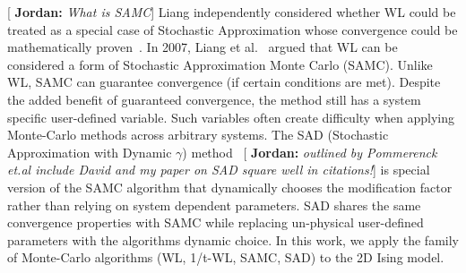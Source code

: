 \documentclass[letterpaper,twocolumn,amsmath,amssymb,pre,aps,10pt]{revtex4-1}
\newcommand{\blue}[1]{{\bf \color{blue} #1}}
\newcommand{\jpsays}[1]{{\color{red} [\blue{Jordan:} \emph{#1}]}}
\begin{document}
\jpsays{What is SAMC}
Liang independently considered whether WL could be treated as a special
case of Stochastic Approximation whose convergence could be
mathematically proven~\cite{liang2006theory, liang2007stochastic}. In
2007, Liang et al.~\cite{liang2007stochastic} argued that WL can be
considered a form of Stochastic Approximation Monte Carlo (SAMC).
Unlike WL, SAMC can guarantee convergence (if certain conditions are
met). Despite the added benefit of guaranteed convergence, the method
still has a system specific user-defined variable. Such variables often
create difficulty when applying Monte-Carlo methods across arbitrary
systems.  The SAD (Stochastic Approximation with Dynamic $\gamma$)
method~\jpsays{outlined by Pommerenck et.al include David and my paper
on SAD square well in citations!} is special version of the SAMC
algorithm that dynamically chooses the modification factor rather than
relying on system dependent parameters. SAD shares the same convergence
properties with SAMC while replacing un-physical user-defined parameters
with the algorithms dynamic choice.  In this work, we apply the family
of Monte-Carlo algorithms (WL, 1/t-WL, SAMC, SAD) to the 2D Ising model.



\end{document}

